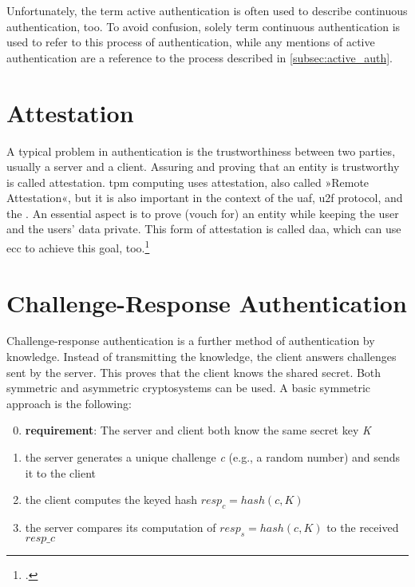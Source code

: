 Unfortunately, the term active authentication is often used to describe continuous authentication, too. To avoid confusion, solely term continuous authentication is used to refer to this process of authentication, while any mentions of active authentication are a reference to the process described in \autoref{subsec:active_auth}.

\section{Attestation}

A typical problem in authentication is the trustworthiness between two parties, usually a server and a client. Assuring and proving that an entity is trustworthy is called attestation. \Gls{tpm} computing uses attestation, also called »Remote Attestation«, but it is also important in the context of the \gls{uaf}, \gls{u2f} protocol, and the \wa. An essential aspect is to prove (\frqq vouch for\flqq) an entity while keeping the user and the users' data private. This form of attestation is called \gls{daa}, which can use \gls{ecc} to achieve this goal, too.\footcites[See][]{trusted-comp}[See][501]{1698485}[See][4]{Coker:2011:PRA:1989153.1989155}[See][100]{2178405}[See][226]{10.1007/978-3-642-12510-2_16}

\section{Challenge-Response Authentication}

Challenge-response authentication is a further method of authentication by knowledge. Instead of transmitting the knowledge, the client answers challenges sent by the server. This proves that the client knows the shared secret. Both symmetric and asymmetric cryptosystems can be used. A basic symmetric approach is the following:

\begin{enumerate}
	\setcounter{enumi}{-1} 
	\item \textbf{requirement}: The server and client both know the same secret key \textit{K}
	\item the server generates a unique challenge \textit{c} (e.g., a random number) and sends it to the client 
	\item the client computes the keyed hash \(resp_c = hash(c, K)\)
	\item the server compares its computation of \(resp_s = hash(c, K)\) to the received \textit{\(resp\_c\)}
\end{enumerate}

